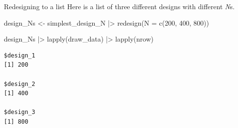 \documentclass[
  11pt,
  ignorenonframetext,
]{beamer}
\newenvironment{Shaded}{\begin{snugshade}}{\end{snugshade}}
\newcommand{\AttributeTok}[1]{\textcolor[rgb]{0.40,0.45,0.13}{#1}}
\newcommand{\DecValTok}[1]{\textcolor[rgb]{0.68,0.00,0.00}{#1}}
\newcommand{\FunctionTok}[1]{\textcolor[rgb]{0.28,0.35,0.67}{#1}}
\newcommand{\NormalTok}[1]{\textcolor[rgb]{0.00,0.23,0.31}{#1}}
\newcommand{\OtherTok}[1]{\textcolor[rgb]{0.00,0.23,0.31}{#1}}
\newcommand{\SpecialCharTok}[1]{\textcolor[rgb]{0.37,0.37,0.37}{#1}}
\begin{document}
\begin{frame}[fragile]{Redesigning to a list}
\protect\hypertarget{redesigning-to-a-list}{}
Here is a list of three different designs with different \emph{N}s.

\begin{Shaded}
\begin{Highlighting}[]
\NormalTok{design\_Ns }\OtherTok{\textless{}{-}}\NormalTok{ simplest\_design\_N }\SpecialCharTok{|\textgreater{}} \FunctionTok{redesign}\NormalTok{(}\AttributeTok{N =} \FunctionTok{c}\NormalTok{(}\DecValTok{200}\NormalTok{, }\DecValTok{400}\NormalTok{, }\DecValTok{800}\NormalTok{))}

\NormalTok{design\_Ns }\SpecialCharTok{|\textgreater{}} \FunctionTok{lapply}\NormalTok{(draw\_data) }\SpecialCharTok{|\textgreater{}} \FunctionTok{lapply}\NormalTok{(nrow)}
\end{Highlighting}
\end{Shaded}

\begin{verbatim}
$design_1
[1] 200

$design_2
[1] 400

$design_3
[1] 800
\end{verbatim}
\end{frame}
\end{document}
